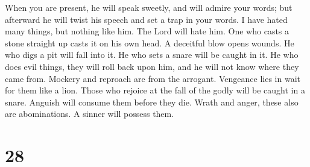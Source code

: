  When you are present, he will speak sweetly, and will
admire your words; but afterward he will twist his speech and set a trap
in your words.  I have hated many things, but nothing
like him. The Lord will hate him.  One who casts a stone
straight up casts it on his own head. A deceitful blow opens wounds.
 He who digs a pit will fall into it. He who sets a snare
will be caught in it.  He who does evil things, they will
roll back upon him, and he will not know where they came from.
 Mockery and reproach are from the arrogant. Vengeance
lies in wait for them like a lion.  Those who rejoice at
the fall of the godly will be caught in a snare. Anguish will consume
them before they die.  Wrath and anger, these also are
abominations. A sinner will possess them.

\hypertarget{section-24}{%
\section{28}\label{section-24}}


